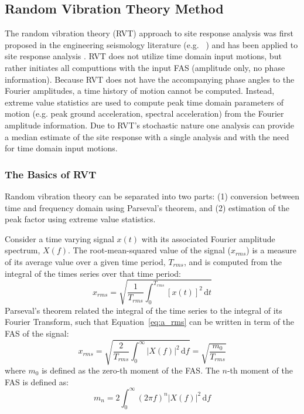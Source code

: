 \documentclass[12pt,oneside]{book}
\newcommand{\ud}{\,\mathrm{d}}
\begin{document}
\subsection{Random Vibration Theory Method}\label{ch:sra:methods:rvt}
The random vibration theory (RVT) approach to site response analysis was first proposed in the
engineering seismology literature (e.g. ~\citet{schneider:91}) and has been applied to site response
analysis \citep{silva:97,rathje:05}. RVT does not utilize time domain input motions, but rather
initiates all computtions with the input FAS (amplitude only, no phase information).  Because RVT
does not have the accompanying phase angles to the Fourier amplitudes, a time history of motion
cannot be computed.  Instead, extreme value statistics are used to compute peak time domain
parameters of motion (e.g. peak ground acceleration, spectral acceleration) from the Fourier
amplitude information. Due to RVT's stochastic nature one analysis can provide a median estimate of
the site response with a single analysis and with the need for time domain input motions.  

\subsubsection{The Basics of RVT}
Random vibration theory can be separated into two parts: (1) conversion between time and frequency
domain using Parseval's theorem, and (2) estimation of the peak factor using extreme value
statistics.

Consider a time varying signal $x(t)$ with its associated Fourier amplitude spectrum, $X(f)$.  The
root-mean-squared value of the signal ($x_{rms}$) is a measure of its average value over a given
time period, $T_{rms}$, and is computed from the integral of the times series over that time period:
\begin{equation}
    x_{rms} = \sqrt{ \frac{1}{T_{rms}} \int_0^{T_{rms}} \left[ x(t) \right]^2 \ud t }
    \label{eq:a_rms}
\end{equation}
Parseval's theorem related the integral of the time series to the integral of its Fourier Transform,
such that Equation~\ref{eq:a_rms} can be written in term of the FAS of the signal:
\begin{equation}
    x_{rms} = \sqrt{ \frac{2}{T_{rms}} \int_0^{\infty} |X(f)|^2 \ud f } = \sqrt{\frac{m_0}{T_{rms}}}
    \label{eq:rvt:rms}
\end{equation}
where $m_0$ is defined as the zero-th moment of the FAS.  The $n$-th moment of the FAS is defined
as:
\begin{equation}
    m_n = 2 \int_0^{\infty} \left( 2 \pi f \right)^n |X(f)|^2 \ud f
    \label{eq:rvt:moments}
\end{equation}
\end{document}
